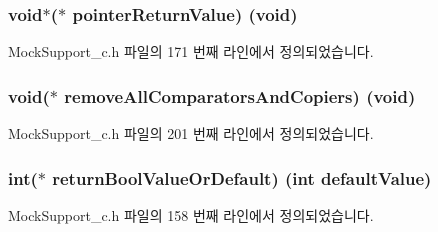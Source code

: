 \subsubsection[{\texorpdfstring{pointer\+Return\+Value}{pointerReturnValue}}]{\setlength{\rightskip}{0pt plus 5cm}void$\ast$($\ast$ pointer\+Return\+Value) (void)}\hypertarget{struct_s_mock_support__c_abacba40fdd32e5aed923df2a2ad4bd84}{}\label{struct_s_mock_support__c_abacba40fdd32e5aed923df2a2ad4bd84}


Mock\+Support\+\_\+c.\+h 파일의 171 번째 라인에서 정의되었습니다.

\subsubsection[{\texorpdfstring{remove\+All\+Comparators\+And\+Copiers}{removeAllComparatorsAndCopiers}}]{\setlength{\rightskip}{0pt plus 5cm}void($\ast$ remove\+All\+Comparators\+And\+Copiers) (void)}\hypertarget{struct_s_mock_support__c_a73f1d1f12de7d72609e8f2b3f5e592f9}{}\label{struct_s_mock_support__c_a73f1d1f12de7d72609e8f2b3f5e592f9}


Mock\+Support\+\_\+c.\+h 파일의 201 번째 라인에서 정의되었습니다.

\subsubsection[{\texorpdfstring{return\+Bool\+Value\+Or\+Default}{returnBoolValueOrDefault}}]{\setlength{\rightskip}{0pt plus 5cm}int($\ast$ return\+Bool\+Value\+Or\+Default) (int default\+Value)}\hypertarget{struct_s_mock_support__c_add9da47e3578bf177c1aa0710d977413}{}\label{struct_s_mock_support__c_add9da47e3578bf177c1aa0710d977413}


Mock\+Support\+\_\+c.\+h 파일의 158 번째 라인에서 정의되었습니다.

